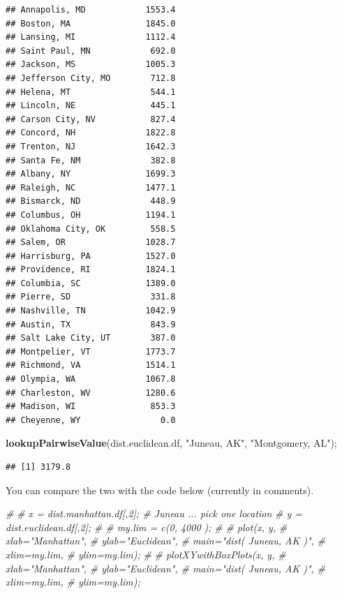 \documentclass[
]{article}
\newenvironment{Shaded}{\begin{snugshade}}{\end{snugshade}}
\newcommand{\CommentTok}[1]{\textcolor[rgb]{0.56,0.35,0.01}{\textit{#1}}}
\newcommand{\KeywordTok}[1]{\textcolor[rgb]{0.13,0.29,0.53}{\textbf{#1}}}
\newcommand{\NormalTok}[1]{#1}
\newcommand{\StringTok}[1]{\textcolor[rgb]{0.31,0.60,0.02}{#1}}
\begin{document}
\begin{verbatim}
## Annapolis, MD            1553.4
## Boston, MA               1845.0
## Lansing, MI              1112.4
## Saint Paul, MN            692.0
## Jackson, MS              1005.3
## Jefferson City, MO        712.8
## Helena, MT                544.1
## Lincoln, NE               445.1
## Carson City, NV           827.4
## Concord, NH              1822.8
## Trenton, NJ              1642.3
## Santa Fe, NM              382.8
## Albany, NY               1699.3
## Raleigh, NC              1477.1
## Bismarck, ND              448.9
## Columbus, OH             1194.1
## Oklahoma City, OK         558.5
## Salem, OR                1028.7
## Harrisburg, PA           1527.0
## Providence, RI           1824.1
## Columbia, SC             1389.0
## Pierre, SD                331.8
## Nashville, TN            1042.9
## Austin, TX                843.9
## Salt Lake City, UT        387.0
## Montpelier, VT           1773.7
## Richmond, VA             1514.1
## Olympia, WA              1067.8
## Charleston, WV           1280.6
## Madison, WI               853.3
## Cheyenne, WY                0.0
\end{verbatim}

\begin{Shaded}
\begin{Highlighting}[]
\KeywordTok{lookupPairwiseValue}\NormalTok{(dist.euclidean.df, }\StringTok{"Juneau, AK"}\NormalTok{, }\StringTok{"Montgomery, AL"}\NormalTok{);}
\end{Highlighting}
\end{Shaded}

\begin{verbatim}
## [1] 3179.8
\end{verbatim}

You can compare the two with the code below (currently in comments).

\begin{Shaded}
\begin{Highlighting}[]
\CommentTok{\# }
\CommentTok{\# x = dist.manhattan.df[,2]; \# Juneau ... pick one location}
\CommentTok{\# y = dist.euclidean.df[,2];}
\CommentTok{\# }
\CommentTok{\# my.lim = c(0, 4000 );}
\CommentTok{\# }
\CommentTok{\# plot(x, y,}
\CommentTok{\#             xlab="Manhattan",}
\CommentTok{\#             ylab="Euclidean",}
\CommentTok{\#             main="dist( Juneau, AK )",}
\CommentTok{\#             xlim=my.lim,}
\CommentTok{\#             ylim=my.lim);}
\CommentTok{\# }
\CommentTok{\# plotXYwithBoxPlots(x, y,}
\CommentTok{\#             xlab="Manhattan",}
\CommentTok{\#             ylab="Euclidean",}
\CommentTok{\#             main="dist( Juneau, AK )",}
\CommentTok{\#             xlim=my.lim,}
\CommentTok{\#             ylim=my.lim);}
\end{Highlighting}
\end{Shaded}
\end{document}
